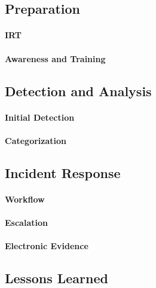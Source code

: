 \subsection{Preparation}
\paragraph{\acl{IRT}}
\paragraph{Awareness and Training}
\subsection{Detection and Analysis}
\paragraph{Initial Detection}
\paragraph{Categorization}
\subsection{Incident Response}
\paragraph{Workflow}
\paragraph{Escalation}
\paragraph{Electronic Evidence}
\subsection{Lessons Learned}